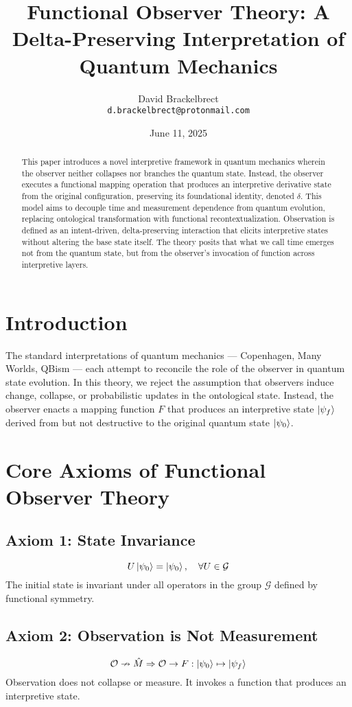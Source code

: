 \documentclass[12pt]{article}
\title{Functional Observer Theory: A Delta-Preserving Interpretation of Quantum Mechanics}
\author{David Brackelbrect\\ \texttt{d.brackelbrect@protonmail.com}}
\date{June 11, 2025}
\begin{document}
\maketitle

\begin{abstract}
This paper introduces a novel interpretive framework in quantum mechanics wherein the observer neither collapses nor branches the quantum state. Instead, the observer executes a functional mapping operation that produces an interpretive derivative state from the original configuration, preserving its foundational identity, denoted $\delta$. This model aims to decouple time and measurement dependence from quantum evolution, replacing ontological transformation with functional recontextualization. Observation is defined as an intent-driven, delta-preserving interaction that elicits interpretive states without altering the base state itself. The theory posits that what we call time emerges not from the quantum state, but from the observer's invocation of function across interpretive layers.
\end{abstract}

\section{Introduction}
The standard interpretations of quantum mechanics --- Copenhagen, Many Worlds, QBism --- each attempt to reconcile the role of the observer in quantum state evolution. In this theory, we reject the assumption that observers induce change, collapse, or probabilistic updates in the ontological state. Instead, the observer enacts a mapping function $F$ that produces an interpretive state $\ket{\psi_f}$ derived from but not destructive to the original quantum state $\ket{\psi_0}$.

\section{Core Axioms of Functional Observer Theory}
\subsection*{Axiom 1: State Invariance}
\[ U \ket{\psi_0} = \ket{\psi_0}, \quad \forall U \in \mathcal{G} \]
The initial state is invariant under all operators in the group $\mathcal{G}$ defined by functional symmetry.

\subsection*{Axiom 2: Observation is Not Measurement}
\[ \mathcal{O} \nrightarrow \hat{M} \Rightarrow \mathcal{O} \rightarrow F : \ket{\psi_0} \mapsto \ket{\psi_f} \]
Observation does not collapse or measure. It invokes a function that produces an interpretive state.
\end{document}
